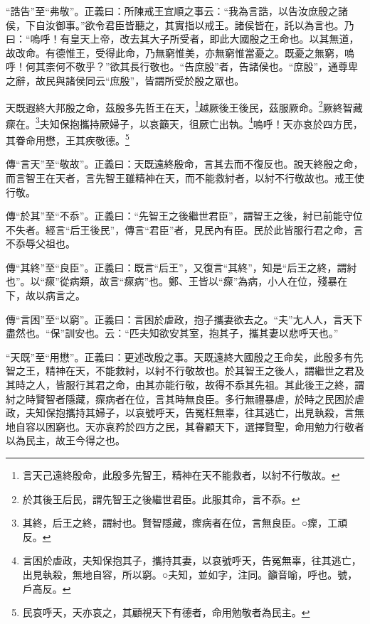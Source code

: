 {\noindent\shu{}\fzkt “誥告”至“弗敬”。正義曰：所陳戒王宜順之事云：“我為言誥，以告汝庶殷之諸侯，下自汝御事。”欲令君臣皆聽之，其實指以戒王。諸侯皆在，託以為言也。乃曰：“嗚呼！有皇天上帝，改去其大子所受者，即此大國殷之王命也。以其無道，故改命。有德惟王，受得此命，乃無窮惟美，亦無窮惟當憂之。既憂之無窮，嗚呼！何其柰何不敬乎？”欲其長行敬也。“告庶殷”者，告諸侯也。“庶殷”，通尊卑之辭，故民與諸侯同云“庶殷”，皆謂所受於殷之眾也。 \par}

天既遐終大邦殷之命，茲殷多先哲王在天，\footnote{言天己遠終殷命，此殷多先智王，精神在天不能救者，以紂不行敬故。}越厥後王後民，茲服厥命。\footnote{於其後王后民，謂先智王之後繼世君臣。此服其命，言不忝。}厥終智藏瘝在。\footnote{其終，后王之終，謂紂也。賢智隱藏，瘝病者在位，言無良臣。○瘝，工頑反。}夫知保抱攜持厥婦子，以哀籲天，徂厥亡出執。\footnote{言困於虐政，夫知保抱其子，攜持其妻，以哀號呼天，告冤無辜，往其逃亡，出見執殺，無地自容，所以窮。○夫知，並如字，注同。籲音喻，呼也。號，戶高反。}嗚呼！天亦哀於四方民，其眷命用懋，王其疾敬德。\footnote{民哀呼天，天亦哀之，其顧視天下有德者，命用勉敬者為民主。}


{\noindent\zhuan{}\fzbyks 傳“言天”至“敬故”。正義曰：天既遠終殷命，言其去而不復反也。說天終殷之命，而言智王在天者，言先智王雖精神在天，而不能救紂者，以紂不行敬故也。戒王使行敬。 \par}

{\noindent\zhuan{}\fzbyks 傳“於其”至“不忝”。正義曰：“先智王之後繼世君臣”，謂智王之後，紂已前能守位不失者。經言“后王後民”，傳言“君臣”者，見民內有臣。民於此皆服行君之命，言不忝辱父祖也。 \par}

{\noindent\zhuan{}\fzbyks 傳“其終”至“良臣”。正義曰：既言“后王”，又復言“其終”，知是“后王之終，謂紂也”。以“瘝”從病類，故言“瘝病”也。鄭、王皆以“瘝”為病，小人在位，殘暴在下，故以病言之。 \par}

{\noindent\zhuan{}\fzbyks 傳“言困”至“以窮”。正義曰：言困於虐政，抱子攜妻欲去之。“夫”尢人人，言天下盡然也。“保”訓安也。云：“匹夫知欲安其室，抱其子，攜其妻以悲呼天也。” \par}

{\noindent\shu{}\fzkt “天既”至“用懋”。正義曰：更述改殷之事。天既遠終大國殷之王命矣，此殷多有先智之王，精神在天，不能救紂，以紂不行敬故也。於其智王之後人，謂繼世之君及其時之人，皆服行其君之命，由其亦能行敬，故得不忝其先祖。其此後王之終，謂紂之時賢智者隱藏，瘝病者在位，言其時無良臣。多行無禮暴虐，於時之民困於虐政，夫知保抱攜持其婦子，以哀號呼天，告冤枉無辜，往其逃亡，出見執殺，言無地自容以困窮也。天亦哀矜於四方之民，其眷顧天下，選擇賢聖，命用勉力行敬者以為民主，故王今得之也。 \par}

